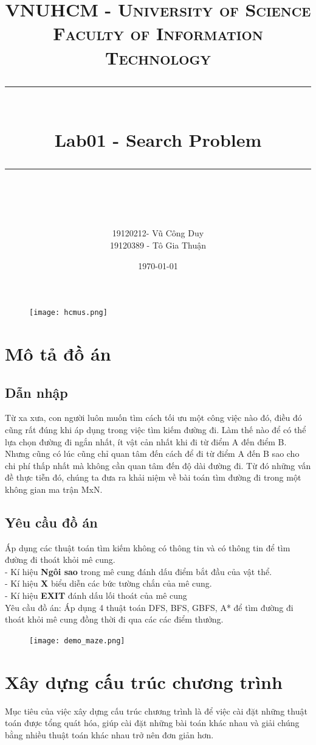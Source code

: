 \documentclass[11pt]{scrartcl} %
\title{	
	\normalfont\normalsize
	\textsc{VNUHCM - University of Science \\Faculty of Information Technology}\\ %
	\vspace{25pt} %
	\rule{\linewidth}{0.5pt}\\ %
	\vspace{20pt} %
	{\huge Lab01 - Search Problem}\\ %
	\vspace{12pt} %
	\rule{\linewidth}{2pt}\\ %
	\vspace{12pt} %
}
\author{\LARGE 19120212- Vũ Công Duy \\ \LARGE 19120389 - Tô Gia Thuận}
\date{\normalsize\today} %
\begin{document}
\maketitle 
\begin{figure}[h] %
	\centering
	\texttt{[image: hcmus.png]} %
\end{figure}
\tableofcontents%
\newpage
\section{Mô tả đồ án}
\subsection{Dẫn nhập}
Từ xa xưa, con người luôn muốn tìm cách tối ưu một công việc nào đó, điều đó cũng rất đúng khi áp dụng trong việc tìm kiếm đường đi. Làm thế nào để có thể lựa chọn đường đi ngắn nhất, ít vật cản nhất khi đi từ điểm A đến điểm B. Nhưng cũng có lúc cũng chỉ quan tâm đến cách để đi từ điểm A đến B sao cho chi phí thấp nhất mà không cần quan tâm đến độ dài đường đi. Từ đó những vấn đề thực tiễn đó, chúng ta đưa ra khải niệm về bài toán tìm đường đi trong một không gian ma trận MxN.
\subsection{Yêu cầu đồ án} \cite{slide}
 Áp dụng các thuật toán tìm kiếm không có thông tin và có thông tin để tìm đường đi thoát khỏi mê cung. 
\\- Kí hiệu \textbf{Ngôi sao} trong mê cung đánh dấu điểm bắt đầu của vật thể. 
\\- Kí hiệu \textbf{X} biểu diễn các bức tường chắn của mê cung.
\\- Kí hiệu \textbf{EXIT} đánh dấu lối thoát của mê cung
\\Yêu cầu đồ án: Áp dụng 4 thuật toán DFS, BFS, GBFS, A* để tìm đường đi thoát khỏi mê cung đồng thời đi qua các các điểm thưởng.
\begin{figure}[h] %
	\centering
	\texttt{[image: demo\_maze.png]} %
\end{figure}

\section{Xây dựng cấu trúc chương trình} \cite{standfordcs221}
Mục tiêu của việc xây dựng cấu trúc chương trình là để việc cài đặt những thuật toán được tổng quát hóa, giúp cài đặt những bài toán khác nhau và giải chúng bằng nhiều thuật toán khác nhau trở nên đơn giản hơn. 
\end{document}
